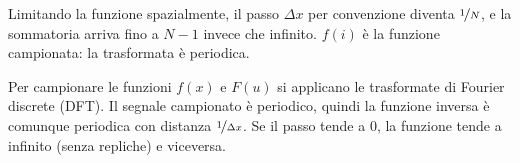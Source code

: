 Limitando la funzione spazialmente, il passo $\Delta x$ per convenzione diventa $\nicefrac{1}{N}$, e la sommatoria arriva fino a $N - 1$ invece che infinito. $f(i)$ è la funzione campionata: la trasformata è periodica. 

Per campionare le funzioni $f(x)$ e $F(u)$ si applicano le trasformate di Fourier discrete (DFT). Il segnale campionato è periodico, quindi la funzione inversa è comunque periodica con distanza $\nicefrac{1}{\Delta x}$. Se il passo tende a 0, la funzione tende a infinito (senza repliche) e viceversa. 







